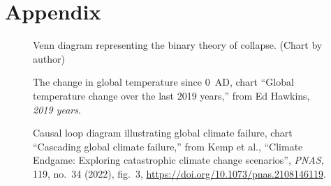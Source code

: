 \documentclass[12pt]{article}
\begin{document}
\clearpage
\section*{Appendix}

\begin{figure}[htbp]
  \centering
  \caption{Venn diagram representing the binary theory of collapse. (Chart by author)}
\end{figure}

\begin{figure}[htbp]
  \centering
  \caption{The change in global temperature since 0~AD, chart ``Global temperature change over the last 2019 years,'' from Ed Hawkins, \textit{2019 years}.}
\end{figure}

\begin{figure}[htbp]
  \centering
  \caption{Causal loop diagram illustrating global climate failure, chart ``Cascading global climate failure,'' from Kemp et al., ``Climate Endgame: Exploring catastrophic climate change scenarios'', \textit{PNAS}, 119, no.\ 34 (2022), fig.\ 3, \url{https://doi.org/10.1073/pnas.2108146119}.}
\end{figure}

\clearpage
\end{document}
